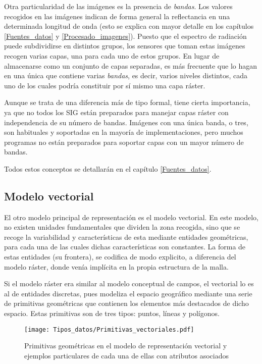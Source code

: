 \begin{multicols}{2}
Otra particularidad de las imágenes es la presencia de \emph{bandas}. Los valores recogidos en las imágenes indican de forma general la reflectancia en una determinada longitud de onda (esto se explica con mayor detalle en los capítulos \ref{Fuentes_datos} y \ref{Procesado_imagenes}). Puesto que el espectro de radiación puede subdividirse en distintos grupos, los sensores que toman estas imágenes recogen varias capas, una para cada uno de estos grupos. En lugar de almacenarse como un conjunto de capas separadas, es más frecuente que lo hagan en una única que contiene varias \emph{bandas}, es decir, varios niveles distintos, cada uno de los cuales podría constituir por sí mismo una capa ráster.

Aunque se trata de una diferencia más de tipo formal, tiene cierta importancia, ya que no todos los SIG están preparados para manejar capas ráster con independencia de su número de bandas. Imágenes con una única banda, o tres, son habituales y soportadas en la mayoría de implementaciones, pero  muchos programas no están preparados para soportar capas con un mayor número de bandas.

Todos estos conceptos se detallarán en el capítulo \ref{Fuentes_datos}.

\subsection{Modelo vectorial}

El otro modelo principal de representación es el modelo vectorial. En este modelo, no existen unidades fundamentales que dividen la zona recogida, sino que se recoge la variabilidad y características de esta mediante entidades geométricas, para cada una de las cuales dichas características son constantes. La forma de estas entidades (su frontera), se codifica de modo explicito, a diferencia del modelo ráster, donde venía implícita en la propia estructura de la malla.

Si el modelo ráster era similar al modelo conceptual de campos, el vectorial lo es al de entidades discretas, pues modeliza el espacio geográfico mediante una serie de primitivas geométricas que contienen los elementos más destacados de dicho espacio. Estas primitivas son de tres tipos: puntos, líneas y polígonos.

\begin{figure*}[ht]   
\centering
\texttt{[image: Tipos\_datos/Primitivas\_vectoriales.pdf]}
\caption{\small Primitivas geométricas en el modelo de representación vectorial y ejemplos particulares de cada una de ellas con atributos asociados}
\label{Fig:Primitivas_vectoriales} 
\end{figure*}


\end{multicols}
